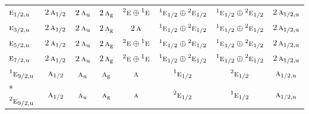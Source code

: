 \documentclass[10pt,a4paper]{article}
\numberwithin{equation}{section}
\newcommand{\irr}[1]{\text{\normalfont\scshape #1}}
\newcommand{\conjpair}[1]{{}^{#1}}
\newcommand{\ptag}[1]{\mathrm{#1}}
\begin{document}
{\begin{longtable}{@{}lccccccc@{}}
$\irr{e}_{1/2,\ptag{u}}$ & $2\,\irr{a}_{1/2}$ & $2\,\irr{a}_{\ptag{u}}$ & $2\,\irr{a}_{\ptag{g}}$ & $\conjpair{2}\irr{e}\oplus \conjpair{1}\irr{e}$ & $\conjpair{1}\irr{e}_{1/2}\oplus \conjpair{2}\irr{e}_{1/2}$ & $\conjpair{1}\irr{e}_{1/2}\oplus \conjpair{2}\irr{e}_{1/2}$ & $2\,\irr{a}_{1/2,\ptag{u}}$\\
$\irr{e}_{3/2,\ptag{u}}$ & $2\,\irr{a}_{1/2}$ & $2\,\irr{a}_{\ptag{u}}$ & $2\,\irr{a}_{\ptag{g}}$ & $2\,\irr{a}$ & $\conjpair{1}\irr{e}_{1/2}\oplus \conjpair{2}\irr{e}_{1/2}$ & $\conjpair{1}\irr{e}_{1/2}\oplus \conjpair{2}\irr{e}_{1/2}$ & $2\,\irr{a}_{1/2,\ptag{u}}$\\
$\irr{e}_{5/2,\ptag{u}}$ & $2\,\irr{a}_{1/2}$ & $2\,\irr{a}_{\ptag{u}}$ & $2\,\irr{a}_{\ptag{g}}$ & $\conjpair{2}\irr{e}\oplus \conjpair{1}\irr{e}$ & $\conjpair{1}\irr{e}_{1/2}\oplus \conjpair{2}\irr{e}_{1/2}$ & $\conjpair{1}\irr{e}_{1/2}\oplus \conjpair{2}\irr{e}_{1/2}$ & $2\,\irr{a}_{1/2,\ptag{u}}$\\
$\irr{e}_{7/2,\ptag{u}}$ & $2\,\irr{a}_{1/2}$ & $2\,\irr{a}_{\ptag{u}}$ & $2\,\irr{a}_{\ptag{g}}$ & $\conjpair{2}\irr{e}\oplus \conjpair{1}\irr{e}$ & $\conjpair{1}\irr{e}_{1/2}\oplus \conjpair{2}\irr{e}_{1/2}$ & $\conjpair{1}\irr{e}_{1/2}\oplus \conjpair{2}\irr{e}_{1/2}$ & $2\,\irr{a}_{1/2,\ptag{u}}$\\
$\conjpair{1}\irr{e}_{9/2,\ptag{u}}$ & $\irr{a}_{1/2}$ & $\irr{a}_{\ptag{u}}$ & $\irr{a}_{\ptag{g}}$ & $\irr{a}$ & $\conjpair{1}\irr{e}_{1/2}$ & $\conjpair{2}\irr{e}_{1/2}$ & $\irr{a}_{1/2,\ptag{u}}$\\*
$\conjpair{2}\irr{e}_{9/2,\ptag{u}}$ & $\irr{a}_{1/2}$ & $\irr{a}_{\ptag{u}}$ & $\irr{a}_{\ptag{g}}$ & $\irr{a}$ & $\conjpair{2}\irr{e}_{1/2}$ & $\conjpair{1}\irr{e}_{1/2}$ & $\irr{a}_{1/2,\ptag{u}}$\\
\bottomrule\end{longtable}}
\end{document}
